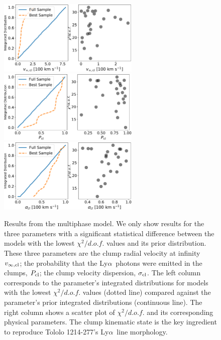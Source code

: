 \documentclass[a4,useAMS,usenatbib,usegraphicx]{mn2e}
\newcommand{\tol}{Tololo 1214-277}
\newcommand{\lya}{\ifmmode{{\rm Ly}\alpha}\else Ly$\alpha$\ \fi}
\begin{document}
\begin{figure}
\begin{center}
  \includegraphics[width=0.6\textwidth]{vinf_cl.pdf}
  \includegraphics[width=0.6\textwidth]{P_cl.pdf}
  \includegraphics[width=0.6\textwidth]{sigma_cl.pdf}
\caption{Results from the multiphase  model.
  We only show results for the three parameters with a significant
  statistical difference between the models with the lowest $\chi^2/d.o.f.$
  values and its prior distribution. 
  These three parameters are the clump radial velocity at infinity 
  $v_{\infty, \rm{cl}}$; the probability that  the \lya photons were
  emitted in the clumps, $P_{\rm cl}$; the clump velocity dispersion,
  $\sigma_{\rm cl}$.
  The left column corresponds to the parameter's integrated distributions for
  models with the lowest $\chi^2/d.o.f.$ values (dotted line) compared against the
  parameter's prior integrated distributions (continuous line).
  The right column shows a scatter plot of $\chi^2/d.o.f.$
  and its corresponding physical parameters.
  The clump kinematic state is the key ingredient to
  reproduce \tol's \lya line morphology.
  \label{multiphaseresults}
}  
\end{center}
\end{figure}
\end{document}
